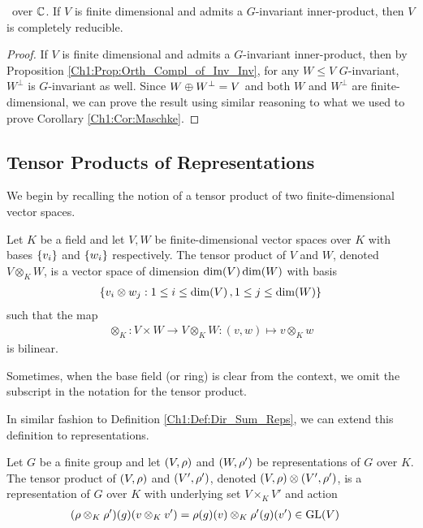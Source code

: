 \begin{corollary}
    \ over $\mathbb{C}$. If $V$ is finite dimensional and admits a $G$-invariant inner-product, then $V$ is completely reducible.
\end{corollary}
\begin{proof}
    If $V$ is finite dimensional and admits a $G$-invariant inner-product, then by Proposition \ref{Ch1:Prop:Orth_Compl_of_Inv_Inv}, for any $W \leq V$ $G$-invariant, $W^\perp$ is $G$-invariant as well. Since $W \oplus W^\perp = V$ and both $W$ and $W^\perp$ are finite-dimensional, we can prove the result using similar reasoning to what we used to prove Corollary \ref{Ch1:Cor:Maschke}.
\end{proof}

\subsection{Tensor Products of Representations}\label{Ch1:Subsec:Tensor_Prods}

We begin by recalling the notion of a tensor product of two finite-dimensional vector spaces.

\begin{definition}
    Let $K$ be a field and let $V, W$ be finite-dimensional vector spaces over $K$ with bases $\left\{ v_i \right\}$ and $\left\{ w_i \right\}$ respectively. The tensor product of $V$ and $W$, denoted $V \otimes_K W$, is a vector space of dimension $\dim\!\left( V \right) \dim\!\left( W \right)$ with basis
    \begin{align}
        \left\{ v_i \otimes w_j : 1 \leq i \leq \dim\!\left( V \right), 1 \leq j \leq \dim\!\left( W \right) \right\}
    \end{align}
    such that the map
    \begin{align*}
        \otimes_K : V \times W \to V \otimes_K W :
        (v,w) \mapsto v \otimes_K w
    \end{align*}
    is bilinear.
\end{definition}
\begin{remark}
    Sometimes, when the base field (or ring) is clear from the context, we omit the subscript in the notation for the tensor product.
\end{remark}

In similar fashion to Definition \ref{Ch1:Def:Dir_Sum_Reps}, we can extend this definition to representations.

\begin{boxdefinition}
    Let $G$ be a finite group and let $\left( V, \rho \right)$ and $\left( W, \rho' \right)$ be representations of $G$ over $K$. The tensor product of $\left( V, \rho \right)$ and $\left( V', \rho' \right)$, denoted $\left( V, \rho \right) \otimes \left( V', \rho' \right)$, is a representation of $G$ over $K$ with underlying set $V \times_K V'$ and action
    \begin{align*}
        \left( \rho \otimes_K \rho' \right)\!\left( g \right)\!\left( v \otimes_K v' \right) &= \rho(g)(v) \otimes_K \rho'(g)(v') \in \operatorname{GL}\!\left( V \right)
    \end{align*}
\end{boxdefinition}

